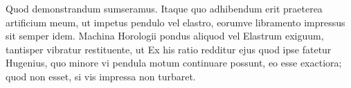 Quod demonstrandum sumseramus.
Itaque quo
adhibendum erit praeterea artificium meum,
ut impetus pendulo vel elastro, eorumve libramento impressus sit semper idem.
Machina Horologii pondus aliquod vel Elastrum exiguum, tantisper
vibratur restituente, ut
%
{}
Ex his ratio redditur ejus quod ipse fatetur Hugenius,\protect{}
quo minore vi pendula motum continuare possunt, eo esse exactiora;
quod non esset, si vis impressa non turbaret.\pend
\count{}
 


 


 


 

